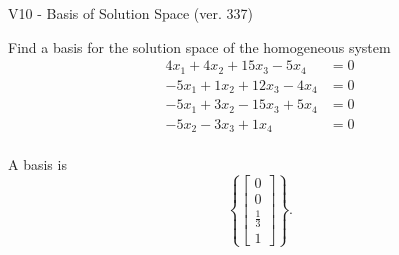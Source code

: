 \begin{exercise}
  \begin{exerciseTitle}V10 - Basis of Solution Space (ver. 337)\end{exerciseTitle}
  \begin{exerciseStatement}
    Find a basis for the solution space of the homogeneous system 
\begin{align*}
 4 x_ 1 + 4 x_ 2 + 15 x_ 3 -5 x_ 4 &= 0  \\ 
  -5 x_ 1 + 1 x_ 2 + 12 x_ 3 -4 x_ 4 &= 0  \\ 
  -5 x_ 1 + 3 x_ 2 -15 x_ 3 + 5 x_ 4 &= 0  \\ 
  -5 x_ 2 -3 x_ 3 + 1 x_ 4 &= 0  \\ 
 \end{align*}


 
  \end{exerciseStatement}

  \begin{exerciseAnswer}
   A basis is   
\[\left\{\left[\begin{array}{c}
0 \\
0 \\
\frac{1}{3} \\
1
\end{array}\right]\right\}.\]

  


  \end{exerciseAnswer}
\end{exercise}